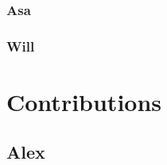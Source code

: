 \documentclass{article}
\begin{document}


\subsubsection{Asa}


\subsubsection{Will}


\section{Contributions}

\subsection{Alex}
\end{document}
